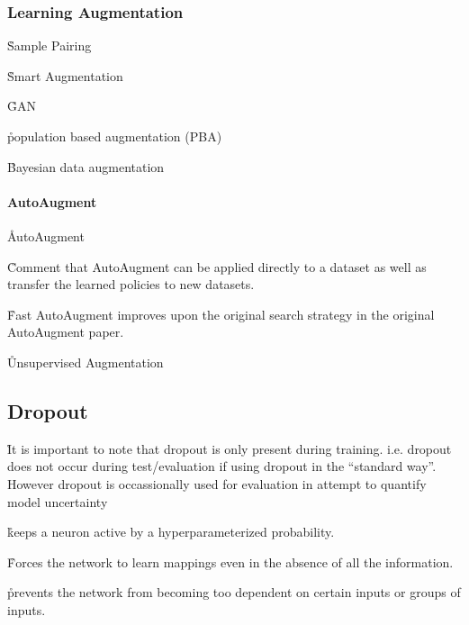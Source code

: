 \subsubsection{Learning Augmentation}

\r{Sample Pairing\cite{inoue2018data}}

\r{Smart Augmentation\cite{lemley2017smart}}

\r{GAN\cite{shrivastava2017learning}}

\r{population based augmentation (PBA)\cite{ho2019population}}

\r{Bayesian data augmentation\cite{tran2017bayesian}}


\paragraph{AutoAugment}

\r{AutoAugment\cite{cubuk2018autoaugment}}

\r{Comment that AutoAugment can be applied directly to a dataset as well as transfer the learned policies to new datasets.}


\r{Fast AutoAugment\cite{lim2019fast} improves upon the original search strategy in the original AutoAugment paper.}

\r{Unsupervised Augmentation}




\subsection{Dropout}


\r{It is important to note that dropout is only present during training. i.e. dropout does not occur during test/evaluation if using dropout in the ``standard way''. However dropout is occassionally used for evaluation in attempt to quantify model uncertainty }

\r{keeps a neuron active by a hyperparameterized probability.}

\r{Forces the network to learn mappings even in the absence of all the information.}

\r{prevents the network from becoming too dependent on certain inputs or groups of inputs.}

